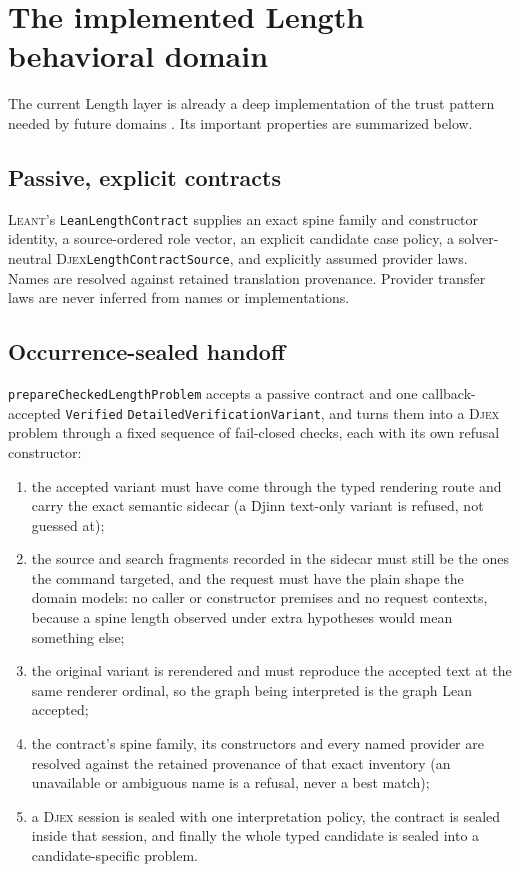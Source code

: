 \documentclass[11pt,oneside]{report}
\newcommand{\Leant}{\textsc{Leant}\xspace}
\newcommand{\Djex}{\textsc{Djex}\xspace}
\newcommand{\code}[1]{\texttt{#1}}
\begin{document}
\section{The implemented Length behavioral domain}
\label{sec:length-baseline}

The current Length layer is already a deep implementation of the trust pattern needed by future domains \cite{leant-length-contract,leant-length-handoff,leant-length-integration,djex-semantic}. Its important properties are summarized below.

\subsection{Passive, explicit contracts}

\Leant's \code{LeanLengthContract} supplies an exact spine family and constructor identity, a source-ordered role vector, an explicit candidate case policy, a solver-neutral \Djex \code{LengthContractSource}, and explicitly assumed provider laws. Names are resolved against retained translation provenance. Provider transfer laws are never inferred from names or implementations.

\subsection{Occurrence-sealed handoff}

\code{prepare\allowbreak Checked\allowbreak Length\allowbreak Problem} accepts a passive contract and one callback-accepted \code{Verified} \code{Detailed\allowbreak Verification\allowbreak Variant}, and turns them into a \Djex problem through a fixed sequence of fail-closed checks, each with its own refusal constructor:

\begin{enumerate}[leftmargin=2em]
\item the accepted variant must have come through the typed rendering route and carry the exact semantic sidecar (a Djinn text-only variant is refused, not guessed at);
\item the source and search fragments recorded in the sidecar must still be the ones the command targeted, and the request must have the plain shape the domain models: no caller or constructor premises and no request contexts, because a spine length observed under extra hypotheses would mean something else;
\item the original variant is rerendered and must reproduce the accepted text at the same renderer ordinal, so the graph being interpreted is the graph Lean accepted;
\item the contract's spine family, its constructors and every named provider are resolved against the retained provenance of that exact inventory (an unavailable or ambiguous name is a refusal, never a best match);
\item a \Djex session is sealed with one interpretation policy, the contract is sealed inside that session, and finally the whole typed candidate is sealed into a candidate-specific problem.
\end{enumerate}
\end{document}
